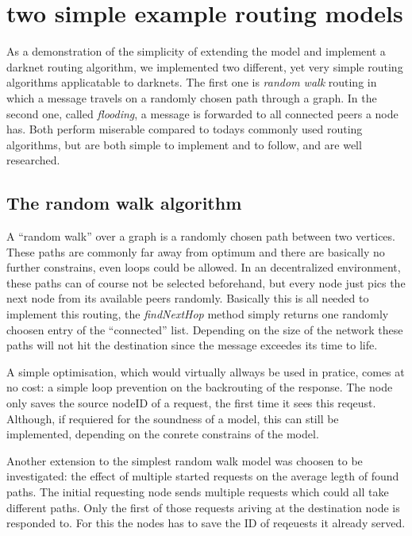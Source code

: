 \section{two simple example routing models}

As a demonstration of the simplicity of extending the model and implement a darknet routing algorithm, we implemented two different, yet very simple routing algorithms applicatable to darknets. The first one is \emph{random walk} routing in which a message travels on a randomly chosen path through a graph. In the second one, called \emph{flooding}, a message is forwarded to all connected peers a node has. Both perform miserable compared to todays commonly used routing algorithms, but are both simple to implement and to follow, and are well researched.

\subsection{The random walk algorithm}

A ``random walk'' over a graph is a randomly chosen path between two vertices. These paths are commonly far away from optimum and there are basically no further constrains, even loops could be allowed. In an decentralized environment, these paths can of course not be selected beforehand, but every node just pics the next node from its available peers randomly. Basically this is all needed to implement this routing, the \emph{findNextHop} method simply returns one randomly choosen entry of the ``connected'' list. Depending on the size of the network these paths will not hit the destination since the message exceedes its time to life.

A simple optimisation, which would virtually allways be used in pratice, comes at no cost: a simple loop prevention on the backrouting of the response. The node only saves the source nodeID of a request, the first time it sees this reqeust. Although, if requiered for the soundness of a model, this can still be implemented, depending on the conrete constrains of the model.

Another extension to the simplest random walk model was choosen to be investigated: the effect of multiple started requests on the average legth of found paths. The initial requesting node sends multiple requests which could all take different paths. Only the first of those requests ariving at the destination node is responded to. For this the nodes has to save the ID of reqeuests it already served.

